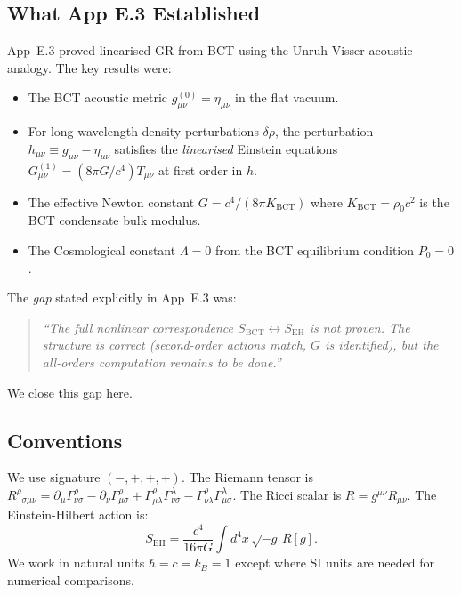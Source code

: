 \documentclass[11pt,a4paper]{article}
\theoremstyle{bctthm}
\theoremstyle{definition}
\begin{document}
\subsection{What App E.3 Established}

App~E.3 proved linearised GR from BCT using the Unruh-Visser acoustic analogy.
The key results were:
\begin{itemize}
\item The BCT acoustic metric $g_{\mu\nu}^{(0)} = \eta_{\mu\nu}$ in the flat
vacuum.
\item For long-wavelength density perturbations $\delta\rho$, the perturbation
$h_{\mu\nu} \equiv g_{\mu\nu} - \eta_{\mu\nu}$ satisfies the \emph{linearised}
Einstein equations $G_{\mu\nu}^{(1)} = (8\pi G/c^4)T_{\mu\nu}$ at first order
in $h$.
\item The effective Newton constant $G = c^4/(8\pi K_\mathrm{BCT})$ where
$K_\mathrm{BCT} = \rho_0 c^2$ is the BCT condensate bulk modulus.
\item The Cosmological constant $\Lambda = 0$ from the BCT equilibrium condition
$P_0 = 0$.
\end{itemize}

The \emph{gap} stated explicitly in App~E.3 was:
\begin{quote}
\emph{``The full nonlinear correspondence $S_\mathrm{BCT} \leftrightarrow S_\mathrm{EH}$
is not proven. The structure is correct (second-order actions match, $G$ is
identified), but the all-orders computation remains to be done.''}
\end{quote}

We close this gap here.

\subsection{Conventions}

We use signature $(-,+,+,+)$. The Riemann tensor is
$R^\rho{}_{\sigma\mu\nu} = \partial_\mu\Gamma^\rho_{\nu\sigma}
- \partial_\nu\Gamma^\rho_{\mu\sigma}
+ \Gamma^\rho_{\mu\lambda}\Gamma^\lambda_{\nu\sigma}
- \Gamma^\rho_{\nu\lambda}\Gamma^\lambda_{\mu\sigma}$.
The Ricci scalar is $R = g^{\mu\nu}R_{\mu\nu}$.
The Einstein-Hilbert action is:
\begin{equation}
S_\mathrm{EH} = \frac{c^4}{16\pi G}\int d^4x\,\sqrt{-g}\,R[g].
\label{eq:SEH}
\end{equation}
We work in natural units $\hbar = c = k_B = 1$ except where SI units are needed
for numerical comparisons.
\end{document}
